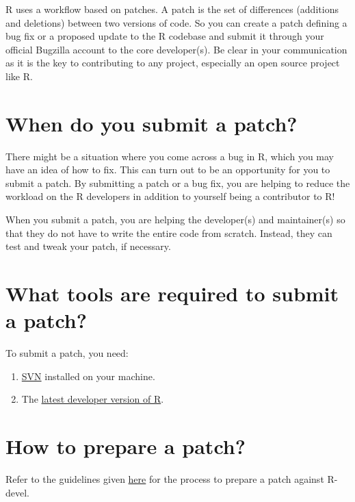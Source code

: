 \documentclass[
]{book}
\begin{document}
R uses a workflow based on patches. A patch is the set of differences (additions and deletions) between two versions of code. So you can create a patch defining a bug fix or a proposed update to the R codebase and submit it through your official Bugzilla account to the core developer(s). Be clear in your communication as it is the key to contributing to any project, especially an open source project like R.

\hypertarget{when-do-you-submit-a-patch}{%
\section{When do you submit a patch?}\label{when-do-you-submit-a-patch}}

There might be a situation where you come across a bug in R, which you may have an idea of how to fix. This can turn out to be an opportunity for you to submit a patch. By submitting a patch or a bug fix, you are helping to reduce the workload on the R developers in addition to yourself being a contributor to R!

When you submit a patch, you are helping the developer(s) and maintainer(s) so that they do not have to write the entire code from scratch. Instead, they can test and tweak your patch, if necessary.

\hypertarget{what-tools-are-required-to-submit-a-patch}{%
\section{What tools are required to submit a patch?}\label{what-tools-are-required-to-submit-a-patch}}

To submit a patch, you need:

\begin{enumerate}
\def\labelenumi{\arabic{enumi}.}
\item
  \href{http://subversion.apache.org/}{SVN} installed on your machine.
\item
  The \protect\hyperlink{installR}{latest developer version of R}.
\end{enumerate}

\hypertarget{how-to-prepare-a-patch}{%
\section{How to prepare a patch?}\label{how-to-prepare-a-patch}}

Refer to the guidelines given \href{https://www.r-project.org/bugs.html\#how-to-submit-patches}{here} for the process to prepare a patch against R-devel.
\end{document}
